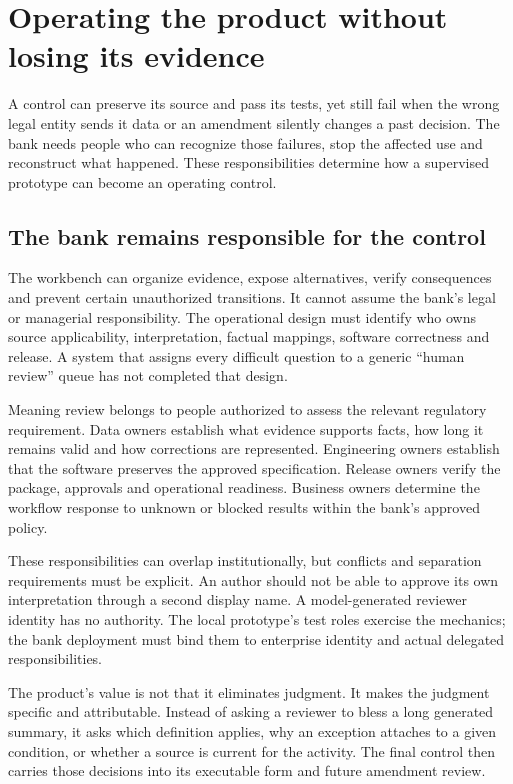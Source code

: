 \chapter{Operating the product without losing its evidence}
\label{ch:operation}

A control can preserve its source and pass its tests, yet still fail when the
wrong legal entity sends it data or an amendment silently changes a past
decision. The bank needs people who can recognize those failures, stop the
affected use and reconstruct what happened. These responsibilities determine
how a supervised prototype can become an operating control.

\section{The bank remains responsible for the control}
\label{merge:M10:00}


The workbench can organize evidence, expose alternatives, verify consequences and
prevent certain unauthorized transitions. It cannot assume the bank's legal or
managerial responsibility. The operational design must identify who owns source
applicability, interpretation, factual mappings, software correctness and release.
A system that assigns every difficult question to a generic ``human review'' queue
has not completed that design.

Meaning review belongs to people authorized to assess the relevant regulatory
requirement. Data owners establish what evidence supports facts, how long it
remains valid and how corrections are represented. Engineering owners establish
that the software preserves the approved specification. Release owners verify the
package, approvals and operational readiness. Business owners determine the
workflow response to unknown or blocked results within the bank's approved policy.


These responsibilities can overlap institutionally, but conflicts and separation
requirements must be explicit. An author should not be able to approve its own
interpretation through a second display name. A model-generated reviewer identity
has no authority. The local prototype's test roles exercise the mechanics; the
bank deployment must bind them to enterprise identity and actual delegated
responsibilities.

The product's value is not that it eliminates judgment. It makes the judgment
specific and attributable. Instead of asking a reviewer to bless a long generated
summary, it asks which definition applies, why an exception attaches to a given
condition, or whether a source is current for the activity. The final control
then carries those decisions into its executable form and future amendment review.


